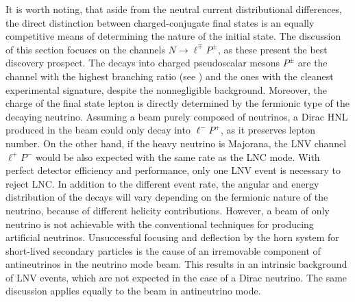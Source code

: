 It is worth noting, that aside from the neutral current distributional differences, %
the direct distinction between charged-conjugate final states is an equally competitive means of determining the nature of the initial state.
The discussion of this section focuses on the channels $N \to \ell^\mp P^\pm$, %
as these present the best discovery prospect.
The decays into charged pseudoscalar mesons $P^\pm$ are the channel with the highest branching ratio (see ) %
and the ones with the cleanest experimental signature, despite the nonnegligible background.
Moreover, the charge of the final state lepton is directly determined by the fermionic type of the decaying neutrino.
Assuming a beam purely composed of neutrinos, a Dirac HNL produced in the beam could only decay into $\ell^- P^+$, %
as it preserves lepton number.
On the other hand, if the heavy neutrino is Majorana, the LNV channel $\ell^+ P^-$ %
would be also expected with the same rate as the LNC mode.
With perfect detector efficiency and performance, only one LNV event is necessary to reject LNC.
In addition to the different event rate, the angular and energy distribution of the decays will vary %
depending on the fermionic nature of the neutrino, because of different helicity contributions.
However, a beam of only neutrino is not achievable with %
the conventional techniques for producing artificial neutrinos.
Unsuccessful focusing and deflection by the horn system for short-lived secondary particles is the cause %
of an irremovable component of antineutrinos in the neutrino mode beam. %
This results in an intrinsic background of LNV events, which are not expected in the case of a Dirac neutrino.
The same discussion applies equally to the beam in antineutrino mode.


